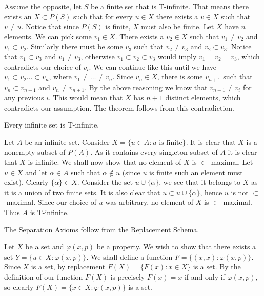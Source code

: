 \begin{solution}
  Assume the opposite, let $S$ be a finite set that is T-infinite.
  That means there exists an $X \subset P(S)$ such that for every $u \in X$ there exists a $v \in X$ such that $v \neq u$.
  Notice that since $P(S)$ is finite, $X$ must also be finite.
  Let $X$ have $n$ elements.
  We can pick some $v_1 \in X$.
  There exists a $v_2 \in X$ such that $v_1 \neq v_2$ and $v_1 \subset v_2$.
  Similarly there must be some $v_3$ such that $v_2 \neq v_3$ and $v_2 \subset v_3$.
  Notice that $v_1 \subset v_3$ and $v_1 \neq v_3$, otherwise $v_1 \subset v_2 \subset v_3$ would imply $v_1 = v_2 = v_3$, which contradicts our choice of $v_i$.
  We can continue like this until we have $v_1 \subset v_2 \ldots \subset v_n$, where $v_1 \neq \dots \neq v_n$.
  Since $v_n \in X$, there is some $v_{n + 1}$ such that $v_n \subset v_{n + 1}$ and $v_n \neq v_{n + 1}$.
  By the above reasoning we know that $v_{n + 1} \neq v_i$ for any previous $i$.
  This would mean that $X$ has $n + 1$ distinct elements, which contradicts our assumption.
  The theorem follows from this contradiction.
\end{solution}

\begin{problem}
  Every infinite set is T-infinite.
\end{problem}

\begin{solution}
  Let $A$ be an infinite set.
  Consider $X = \{u \in A : u \text{ is finite}\}$.
  It is clear that $X$ is a nonempty subset of $P(A)$.
  As it contains every singleton subset of $A$ it is clear that $X$ is infinite.
  We shall now show that no element of $X$ is $\subset$-maximal.
  Let $u \in X$ and let $\alpha \in A$ such that $\alpha \notin u$ (since $u$ is finite such an element must exist).
  Clearly $\{\alpha\} \in X$.
  Consider the set $u \cup \{\alpha\}$, we see that it belongs to $X$ as it is a union of two finite sets.
  It is also clear that $u \subset u \cup \{\alpha\}$, hence $u$ is not $\subset$-maximal.
  Since our choice of $u$ was arbitrary, no element of $X$ is $\subset$-maximal.
  Thus $A$ is T-infinite.
\end{solution}

\begin{problem}
  The Separation Axioms follow from the Replacement Schema.
\end{problem}

\begin{solution}
  Let $X$ be a set and $\varphi(x, p)$ be a property.
  We wish to show that there exists a set $Y = \{u \in X : \varphi(x, p)\}$.
  We shall define a function $F = \{(x, x) : \varphi(x, p)\}$.
  Since $X$ is a set, by replacement $F(X) = \{F(x) : x \in X\}$ is a set.
  By the definition of our function $F(X)$ is precisely $F(x) = x$ if and only if $\varphi(x, p)$, so clearly $F(X) = \{x \in X : \varphi(x, p)\}$ is a set.
\end{solution}

